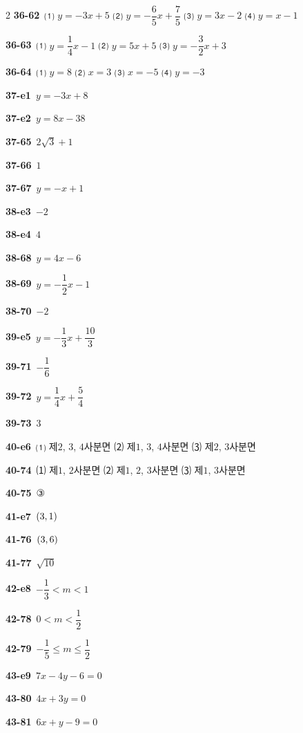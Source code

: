 \documentclass[10pt,a4paper]{article}
\begin{document}
\begin{multicols}{2}
\noindent\textbf{36-62}\ ⑴ $y=-3x+5$ ⑵ $y=-\dfrac{6}{5}x+\dfrac{7}{5}$ ⑶ $y=3x-2$ ⑷ $y=x-1$\par
\noindent\textbf{36-63}\ ⑴ $y=\dfrac{1}{4}x-1$ ⑵ $y=5x+5$ ⑶ $y=-\dfrac{3}{2}x+3$\par
\noindent\textbf{36-64}\ ⑴ $y=8$ ⑵ $x=3$ ⑶ $x=-5$ ⑷ $y=-3$\par
\noindent\textbf{37-e1}\ $y=-3x+8$\par
\noindent\textbf{37-e2}\ $y=8x-38$\par
\noindent\textbf{37-65}\ $2\sqrt{3}+1$\par
\noindent\textbf{37-66}\ $1$\par
\noindent\textbf{37-67}\ $y=-x+1$\par
\noindent\textbf{38-e3}\ $-2$\par
\noindent\textbf{38-e4}\ $4$\par
\noindent\textbf{38-68}\ $y=4x-6$\par
\noindent\textbf{38-69}\ $y=-\dfrac{1}{2}x-1$\par
\noindent\textbf{38-70}\ $-2$\par
\noindent\textbf{39-e5}\ $y=-\dfrac{1}{3}x+\dfrac{10}{3}$\par
\noindent\textbf{39-71}\ $-\dfrac{1}{6}$\par
\noindent\textbf{39-72}\ $y=\dfrac{1}{4}x+\dfrac{5}{4}$\par
\noindent\textbf{39-73}\ $3$\par
\noindent\textbf{40-e6}\ ⑴ 제$2$, $3$, $4$사분면 ⑵ 제$1$, $3$, $4$사분면 ⑶ 제$2$, $3$사분면\par
\noindent\textbf{40-74}\ ⑴ 제$1$, $2$사분면 ⑵ 제$1$, $2$, $3$사분면 ⑶ 제$1$, $3$사분면\par
\noindent\textbf{40-75}\ ③\par
\noindent\textbf{41-e7}\ $(3{,}\mkern3mu\mathopen{}1)$\par
\noindent\textbf{41-76}\ $(3{,}\mkern3mu\mathopen{}6)$\par
\noindent\textbf{41-77}\ $\sqrt{10}$\par
\noindent\textbf{42-e8}\ $-\dfrac{1}{3}<m<1$\par
\noindent\textbf{42-78}\ $0<m<\dfrac{1}{2}$\par
\noindent\textbf{42-79}\ $-\dfrac{1}{5}\le m\le\dfrac{1}{2}$\par
\noindent\textbf{43-e9}\ $7x-4y-6=0$\par
\noindent\textbf{43-80}\ $4x+3y=0$\par
\noindent\textbf{43-81}\ $6x+y-9=0$\par

\end{multicols}
\end{document}
